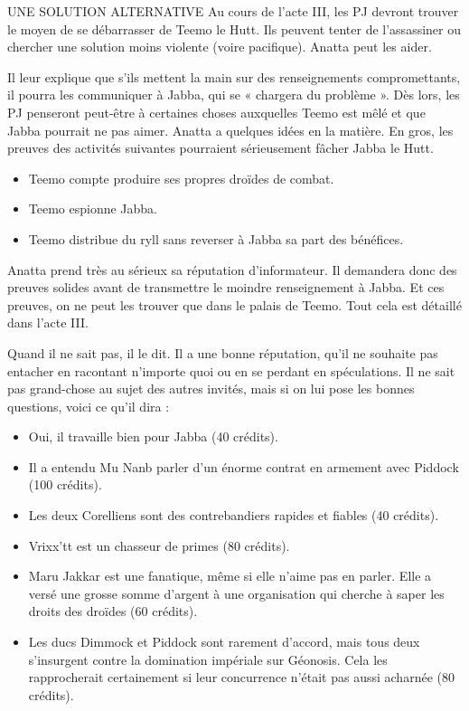 \documentclass[a4paper,10pt,twoside,twocolumn,openany]{book}
\begin{document}
\begin{commentbox}{UNE SOLUTION ALTERNATIVE}
  Au cours de l’acte III, les PJ devront trouver le moyen
de se débarrasser de Teemo le Hutt. Ils peuvent tenter de l’assassiner ou chercher une solution moins
violente (voire pacifique). Anatta peut les aider.

Il leur explique que s’ils mettent la main sur des
renseignements compromettants, il pourra les
communiquer à Jabba, qui se « chargera du problème ». Dès lors, les PJ penseront peut-être à certaines choses auxquelles Teemo est mêlé et que
Jabba pourrait ne pas aimer. Anatta a quelques
idées en la matière. En gros, les preuves des activités suivantes pourraient sérieusement fâcher
Jabba le Hutt.

\begin{itemize}
\item Teemo compte produire ses propres droïdes de combat.
\item Teemo espionne Jabba.
\item Teemo distribue du ryll sans reverser à Jabba sa part des bénéfices.
\end{itemize}

Anatta prend très au sérieux sa réputation d’informateur. Il demandera donc des preuves solides avant
de transmettre le moindre renseignement à Jabba.
Et ces preuves, on ne peut les trouver que dans le
palais de Teemo. Tout cela est détaillé dans l’acte III.

\end{commentbox}

Quand il ne sait pas, il le dit. Il a une bonne réputation, qu’il ne souhaite pas entacher en racontant n’importe quoi ou en se perdant en spéculations. Il ne sait
pas grand-chose au sujet des autres invités, mais si on lui
pose les bonnes questions, voici ce qu’il dira :

\begin{itemize}
\item Oui, il travaille bien pour Jabba (40 crédits).
\item Il a entendu Mu Nanb parler d’un énorme contrat en armement avec Piddock (100 crédits).
\item Les deux Corelliens sont des contrebandiers rapides et fiables (40 crédits).
\item Vrixx’tt est un chasseur de primes (80 crédits).
\item Maru Jakkar est une fanatique, même si elle n’aime pas en parler. Elle a versé une grosse somme d’argent à une organisation qui cherche à saper les droits des droïdes (60 crédits).
\item Les ducs Dimmock et Piddock sont rarement d’accord, mais tous deux s’insurgent contre la domination impériale sur Géonosis. Cela les rapprocherait certainement si leur concurrence n’était pas aussi acharnée (80 crédits).
\end{itemize}
\end{document}
